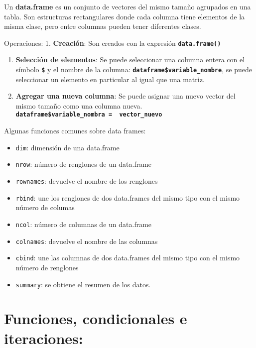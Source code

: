 \documentclass[]{book}
\begin{document}
Un \textbf{data.frame} es un conjunto de vectores del mismo tamaño agrupados en una tabla. Son estructuras rectangulares donde cada columna tiene elementos de la misma clase, pero entre columnas pueden tener diferentes clases.

Operaciones:
1. \textbf{Creación}: Son creados con la expresión \textbf{\texttt{data.frame()}}

\begin{enumerate}
\def\labelenumi{\arabic{enumi}.}
\setcounter{enumi}{1}
\item
  \textbf{Selección de elementos}: Se puede seleccionar una columna entera con el símbolo \textbf{\texttt{\$}} y el nombre de la columna: \textbf{\texttt{dataframe\$variable\_nombre}}, se puede seleccionar un elemento en particular al igual que una matriz.
\item
  \textbf{Agregar una nueva columna}: Se puede asignar una nuevo vector del mismo tamaño como una columna nueva.
  \textbf{\texttt{dataframe\$variable\_nombra\ =\ \ vector\_nuevo}}
\end{enumerate}

Algunas funciones comunes sobre data frames:

\begin{itemize}
\item
  \texttt{dim}: dimensión de una data.frame
\item
  \texttt{nrow}: número de renglones de un data.frame
\item
  \texttt{rownames}: devuelve el nombre de los renglones
\item
  \texttt{rbind}: une los renglones de dos data.frames del mismo tipo con el mismo número de columas
\item
  \texttt{ncol}: número de columnas de un data.frame
\item
  \texttt{colnames}: devuelve el nombre de las columnas
\item
  \texttt{cbind}: une las columnas de dos data.frames del mismo tipo con el mismo número de renglones
\item
  \texttt{summary}: se obtiene el resumen de los datos.
\end{itemize}

\hypertarget{funciones-condicionales-e-iteraciones}{%
\section{Funciones, condicionales e iteraciones:}\label{funciones-condicionales-e-iteraciones}}
\end{document}

